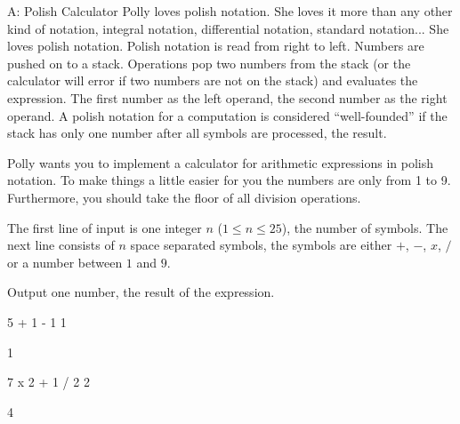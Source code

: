 \begin{problem}{A: Polish Calculator}
Polly loves polish notation.
She loves it more than any other kind of notation, integral notation, differential notation, standard notation...
She loves polish notation.
Polish notation is read from right to left.
Numbers are pushed on to a stack.
Operations pop two numbers from the stack (or the calculator will error if two numbers are not on the stack) and evaluates the expression.
The first number as the left operand, the second number as the right operand.
A polish notation for a computation is considered ``well-founded'' if the stack has only one number after all symbols are processed, the result.

Polly wants you to implement a calculator for arithmetic expressions in polish notation.
To make things a little easier for you the numbers are only from 1 to 9.
Furthermore, you should take the floor of all division operations.
\end{problem}

\begin{formalin}
The first line of input is one integer $n$ ($1 \leq n \leq 25$), the number of symbols.
The next line consists of $n$ space separated symbols, the symbols are either $+$, $-$, $x$, $/$ or a number between $1$ and $9$.
\end{formalin}

\begin{formalout}
Output one number, the result of the expression.
\end{formalout}

\begin{datain}
5
+ 1 - 1 1
\end{datain}
\begin{dataout}
1
\end{dataout}

\begin{datain}
7
x 2 + 1 / 2 2
\end{datain}
\begin{dataout}
4
\end{dataout}
